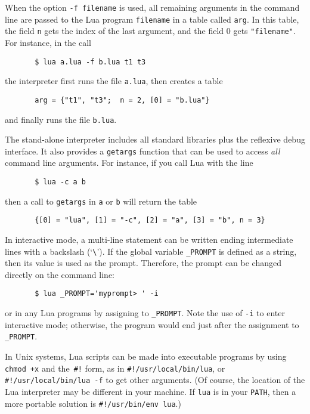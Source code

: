 \documentclass[11pt,twoside,draft]{article}
\makeatletter
\newcommand{\T}[1]{{\tt #1}}
\newcommand{\IndexVerb}[1]{\T{#1}\index{#1@{\tt #1}}}
\newcommand{\DefLIB}[1]{\index{#1@{\tt #1}}}
\makeatother
\begin{document}
When the option \T{-f filename} is used,
all remaining arguments in the command line
are passed to the Lua program \verb|filename| in a table called \verb|arg|.
In this table,
the field \verb|n| gets the index of the last argument,
and the field 0 gets \verb|"filename"|.
For instance, in the call
\begin{verbatim}
       $ lua a.lua -f b.lua t1 t3
\end{verbatim}
the interpreter first runs the file \T{a.lua},
then creates a table
\begin{verbatim}
       arg = {"t1", "t3";  n = 2, [0] = "b.lua"}
\end{verbatim}
and finally runs the file \T{b.lua}.

The stand-alone interpreter includes
all standard libraries plus the reflexive debug interface.
It also provides a \verb|getargs| function that
can be used to access \emph{all} command line arguments.
\DefLIB{getargs}
For instance, if you call Lua with the line
\begin{verbatim}
       $ lua -c a b
\end{verbatim}
then a call to \verb|getargs| in \verb|a| or \verb|b| will return the table
\begin{verbatim}
       {[0] = "lua", [1] = "-c", [2] = "a", [3] = "b", n = 3}
\end{verbatim}

In interactive mode,
a multi-line statement can be written ending intermediate
lines with a backslash (`\verb|\|').
If the global variable \IndexVerb{_PROMPT} is defined as a string,
then its value is used as the prompt.
Therefore, the prompt can be changed directly on the command line:
\begin{verbatim}
       $ lua _PROMPT='myprompt> ' -i
\end{verbatim}
or in any Lua programs by assigning to \verb|_PROMPT|.
Note the use of \verb|-i| to enter interactive mode; otherwise,
the program would end just after the assignment to \verb|_PROMPT|.

In Unix systems, Lua scripts can be made into executable programs
by using \verb|chmod +x| and the~\verb|#!| form,
as in \verb|#!/usr/local/bin/lua|,
or \verb|#!/usr/local/bin/lua -f| to get other arguments.
(Of course,
the location of the Lua interpreter may be different in your machine.
If \verb|lua| is in your \verb|PATH|,
then a more portable solution is \verb|#!/usr/bin/env lua|.)


\end{document}
